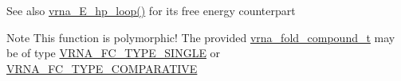 \begin{DoxySeeAlso}{See also}
\mbox{\hyperlink{group__eval__loops__hp_ga57179ea326cc5ed8dfe4d3962b233128}{vrna\+\_\+\+E\+\_\+hp\+\_\+loop()}} for it\textquotesingle{}s free energy counterpart
\end{DoxySeeAlso}
\begin{DoxyNote}{Note}
This function is polymorphic! The provided \mbox{\hyperlink{group__fold__compound_ga1b0cef17fd40466cef5968eaeeff6166}{vrna\+\_\+fold\+\_\+compound\+\_\+t}} may be of type \mbox{\hyperlink{group__fold__compound_gga01a4ff86fa71deaaa5d1abbd95a1447da7e264dd3cf2dc9b6448caabcb7763cd6}{V\+R\+N\+A\+\_\+\+F\+C\+\_\+\+T\+Y\+P\+E\+\_\+\+S\+I\+N\+G\+LE}} or \mbox{\hyperlink{group__fold__compound_gga01a4ff86fa71deaaa5d1abbd95a1447dab821ce46ea3cf665be97df22a76f5023}{V\+R\+N\+A\+\_\+\+F\+C\+\_\+\+T\+Y\+P\+E\+\_\+\+C\+O\+M\+P\+A\+R\+A\+T\+I\+VE}} 
\end{DoxyNote}
